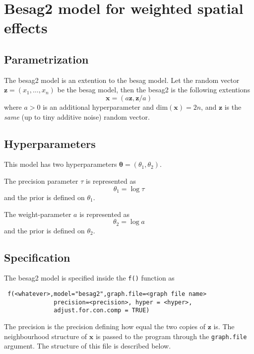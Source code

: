 \documentclass[a4paper,11pt]{article}
\begin{document}
\section*{Besag2 model for weighted spatial effects}

\subsection*{Parametrization}

The besag2 model is an extention to the besag model. Let the random
vector $\mathbf{z}=(x_1,\dots,x_n)$ be the besag model, then the
besag2 is the following extentions
\begin{displaymath}
    \mathbf{x} = (a\mathbf{z}, \mathbf{z}/a)
\end{displaymath}
where $a>0$ is an additional hyperparameter and
$\text{dim}(\mathbf{x}) = 2n$, and $\mathbf{z}$ is the \emph{same} (up
to tiny additive noise) random vector.

\subsection*{Hyperparameters}

This model has two hyperparameters $\mathbf{\theta} = (\theta_{1},
\theta_{2})$.

The precision parameter $\tau$ is represented as
\begin{displaymath}
    \theta_{1} =\log \tau
\end{displaymath}
and the prior is defined on $\theta_{1}$.

The weight-parameter $a$ is represented as
\begin{displaymath}
    \theta_{2} = \log a
\end{displaymath}
and the prior is defined on $\theta_{2}$.

\subsection*{Specification}

The besag2 model is specified inside the {\tt f()} function as
\begin{verbatim}
 f(<whatever>,model="besag2",graph.file=<graph file name>
              precision=<precision>, hyper = <hyper>,
              adjust.for.con.comp = TRUE)
\end{verbatim}

The precision is the precision defining how equal the two copies of
$\mathbf{z}$ is. The neighbourhood structure of $\mathbf{x}$ is passed
to the program through the {\tt graph.file} argument.  The structure
of this file is described below.
\end{document}
